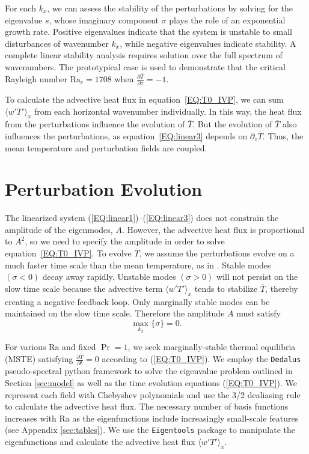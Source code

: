 \documentclass[reprint,amsmath,amssymb,aps,nofootinbib]{revtex4-1}
\newcommand\Ra{\mathrm{Ra}}
\newcommand{\eq}[1]{(\ref{#1})}
\newcommand{\eqss}[2]{(\ref{#1})--(\ref{#2})}
\begin{document}
For each $k_x$, we can assess the stability of the perturbations by solving for the eigenvalue $s$, whose imaginary component $\sigma$ plays the role of an exponential growth rate. 
Positive eigenvalues indicate that the system is unstable to small disturbances of wavenumber $k_x$, while negative eigenvalues indicate stability. 
A complete linear stability analysis requires solution over the full spectrum of wavenumbers. 
The prototypical case is used to demonstrate that the critical Rayleigh number $\Ra_c = 1708$ when $\frac{\partial \overline{T}}{\partial z} = -1$.

To calculate the advective heat flux in equation~\ref{EQ:T0_IVP}, we can sum $\langle w'T' \rangle_x$ from each horizontal wavenumber individually.
In this way, the heat flux from the perturbations influence the evolution of $\overline{T}$.
But the evolution of $\overline{T}$ also influences the perturbations, as equation~\ref{EQ:linear3} depends on $\partial_z \overline{T}$.
Thus, the mean temperature and perturbation fields are coupled.

\section{Perturbation Evolution}\label{sec:evolution}
The linearized system \eqss{EQ:linear1}{EQ:linear3} does not constrain the amplitude of the eigenmodes, $A$.
However, the advective heat flux is proportional to $A^2$, so we need to specify the amplitude in order to solve equation~\ref{EQ:T0_IVP}.
To evolve $\overline{T}$, we assume the perturbations evolve on a much faster time scale than the mean temperature, as in \cite{michel_chini_2019}.
Stable modes $(\sigma < 0)$ decay away rapidly. 
Unstable modes $(\sigma > 0)$ will not persist on the slow time scale because the advective term $\langle w'T' \rangle_x$ tends to stabilize $\overline{T}$, thereby creating a negative feedback loop.
Only marginally stable modes can be maintained on the slow time scale.
Therefore the amplitude $A$ must satisfy
\begin{equation}
    \max_{k_x} \{ \sigma \} = 0.
\end{equation}

For various $\Ra$ and fixed $\Pr = 1$, we seek marginally-stable thermal equilibria (MSTE) satisfying $\frac{\partial \overline{T}}{\partial t} = 0$ according to \eq{EQ:T0_IVP}. 
We employ the \texttt{Dedalus} pseudo-spectral python framework\footnotemark[1] \cite{Dedalus_2020} to solve the eigenvalue problem outlined in Section \ref{sec:model} as well as the time evolution equations \eq{EQ:T0_IVP}.
We represent each field with Chebyshev polynomials and use the 3/2 dealiasing rule to calculate the advective heat flux.
The necessary number of basis functions increases with $\Ra$ as the eigenfunctions include increasingly small-scale features (see Appendix \ref{sec:tables}). 
We use the \texttt{Eigentools} package\footnotemark[2] \cite{Eigentools} to manipulate the eigenfunctions and calculate the advective heat flux $\langle w' T' \rangle_x$.
\end{document}
